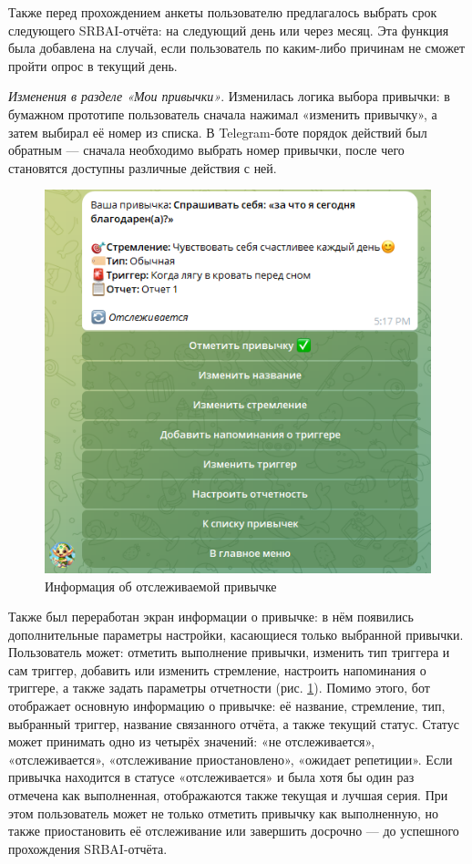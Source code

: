 \documentclass[pdflatex,sn-mathphys-num]{sn-jnl}%
\theoremstyle{thmstyleone}%
\theoremstyle{thmstyletwo}%
\theoremstyle{thmstylethree}%
\begin{document}
Также перед прохождением анкеты пользователю предлагалось выбрать срок следующего SRBAI-отчёта: на следующий день или через месяц. Эта функция была добавлена на случай, если пользователь по каким-либо причинам не сможет пройти опрос в текущий день.

\textit{Изменения в разделе «Мои привычки»}. Изменилась логика выбора привычки: в бумажном прототипе пользователь сначала нажимал «изменить привычку», а затем выбирал её номер из списка. В Telegram-боте порядок действий был обратным — сначала необходимо выбрать номер привычки, после чего становятся доступны различные действия с ней. 

\begin{figure}
    \centering
    \includegraphics[width=0.6\linewidth]{figures/Bot/bot_habit_info.png}
    \caption{Информация об отслеживаемой привычке}
    \label{fig:bot_habit_info}
\end{figure}

Также был переработан экран информации о привычке: в нём появились дополнительные параметры настройки, касающиеся только выбранной привычки. Пользователь может:
отметить выполнение привычки, изменить тип триггера и сам триггер, добавить или изменить стремление, настроить напоминания о триггере, а также задать параметры отчетности (рис. \ref{fig:bot_habit_info}). Помимо этого, бот отображает основную информацию о привычке: её название, стремление, тип, выбранный триггер, название связанного отчёта, а также текущий статус. Статус может принимать одно из четырёх значений: «не отслеживается», «отслеживается», «отслеживание приостановлено», «ожидает репетиции». Если привычка находится в статусе «отслеживается» и была хотя бы один раз отмечена как выполненная, отображаются также текущая и лучшая серия. При этом пользователь может не только отметить привычку как выполненную, но также приостановить её отслеживание или завершить досрочно — до успешного прохождения SRBAI-отчёта.
\end{document}

